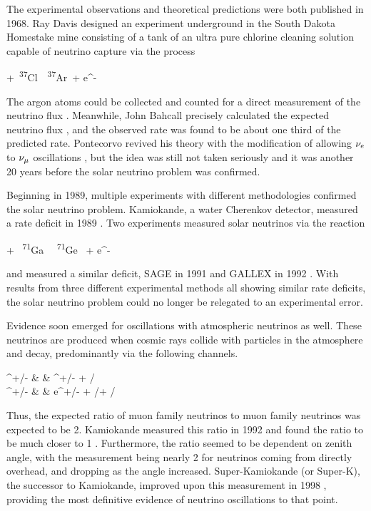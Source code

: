 The experimental observations and theoretical predictions were both published in 1968. Ray Davis designed an experiment underground in the South Dakota Homestake mine consisting of a tank of an ultra pure chlorine cleaning solution capable of neutrino capture via the process

\beq
\nue +\mbox{ \textsuperscript{37}Cl }\rightarrow\mbox{ \textsuperscript{37}Ar }+ e^{-}
\label{eq:DavisExp}
\eeq

\n The argon atoms could be collected and counted for a direct measurement of the neutrino flux \cite{ref:Davis}. Meanwhile, John Bahcall precisely calculated the expected neutrino flux \cite{ref:Bahcall}, and the observed rate was found to be about one third of the predicted rate. Pontecorvo revived his theory with the modification of allowing $\nu_{e}$ to $\nu_{\mu}$ oscillations \cite{ref:Pontecorvo2}, but the idea was still not taken seriously and it was another 20 years before the solar neutrino problem was confirmed. 

Beginning in 1989, multiple experiments with different methodologies confirmed the solar neutrino problem. Kamiokande, a water Cherenkov detector, measured a rate deficit in 1989 \cite{ref:Kamiokande}. Two experiments measured solar neutrinos via the reaction

\beq
\nue + \mbox{ \textsuperscript{71}Ga } \rightarrow \mbox{ \textsuperscript{71}Ge } + e^{-}
\label{eq:GaExp}
\eeq

\n and measured a similar deficit, SAGE in 1991 \cite{ref:SAGE} and GALLEX in 1992 \cite{ref:GALLEX}. With results from three different experimental methods all showing similar rate deficits, the solar neutrino problem could no longer be relegated to an experimental error.

Evidence soon emerged for oscillations with atmospheric neutrinos as well. These neutrinos are produced when cosmic rays collide with particles in the atmosphere and decay, predominantly via the following channels.

\beqa
\pi^{+/-} & \rightarrow & \mu^{+/-} + \numu/\anumu \nonumber \\
\mu^{+/-} & \rightarrow & e^{+/-} + \nue/\anue + \anumu/\numu
\label{eq:AtmNu}
\eeqa

\n Thus, the expected ratio of muon family neutrinos to muon family neutrinos was expected to be 2. Kamiokande measured this ratio in 1992 and found the ratio to be much closer to 1 \cite{ref:KamioAtm}. Furthermore, the ratio seemed to be dependent on zenith angle, with the measurement being nearly 2 for neutrinos coming from directly overhead, and dropping as the angle increased. Super-Kamiokande (or Super-K), the successor to Kamiokande, improved upon this measurement in 1998 \cite{ref:SuperKAtm}, providing the most definitive evidence of neutrino oscillations to that point.

